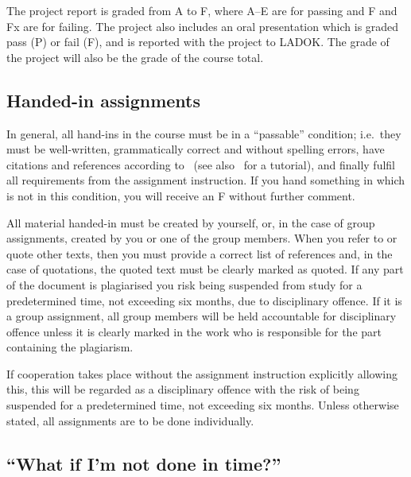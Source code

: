 The project report is graded from A to F, where A--E are for passing and F and 
Fx are for failing.
The project also includes an oral presentation which is graded pass (P) or fail 
(F), and is reported with the project to LADOK\@.
The grade of the project will also be the grade of the course total.

\subsection{Handed-in assignments}

In general, all hand-ins in the course must be in a \enquote{passable} 
condition; i.e.~they must be well-written, grammatically correct and without 
spelling errors, have citations and references according to~\cite{IEEEcitation} 
(see also~\cite{PurdueCitation} for a tutorial), and finally fulfil all 
requirements from the assignment instruction.
If you hand something in which is not in this condition, you will receive an 
F without further comment.

All material handed-in must be created by yourself, or, in the case of group 
assignments, created by you or one of the group members.
When you refer to or quote other texts, then you must provide a correct list of 
references and, in the case of quotations, the quoted text must be clearly 
marked as quoted.
If any part of the document is plagiarised you risk being suspended from study 
for a predetermined time, not exceeding six months, due to disciplinary 
offence.
If it is a group assignment, all group members will be held accountable for 
disciplinary offence unless it is clearly marked in the work who is responsible 
for the part containing the plagiarism.

If cooperation takes place without the assignment instruction explicitly 
allowing this, this will be regarded as a disciplinary offence with the risk of
being suspended for a predetermined time, not exceeding six months.
Unless otherwise stated, all assignments are to be done individually.

\subsection{\enquote{What if I'm not done in time?}}%
\label{sec:late}



\printbibliography{}
